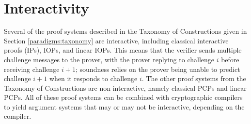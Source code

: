 \section{Interactivity}
\label{paradigms:interactivity} 





Several of the proof systems described in the Taxonomy of Constructions given in Section \ref{paradigms:taxonomy}
are interactive, including classical interactive proofs (IPs), IOPs, and linear IOPs. 
This means that the verifier sends multiple challenge messages to the prover,
with the prover replying to challenge $i$ before receiving challenge $i+1$;
soundness relies on the prover being unable to predict challenge $i+1$ when it responds to challenge $i$.
The other proof systems from the Taxonomy of Constructions are non-interactive, namely classical PCPs and linear PCPs. 
All of these proof systems can be combined with cryptographic
compilers to yield argument systems that may or may not be interactive, depending on the compiler.



